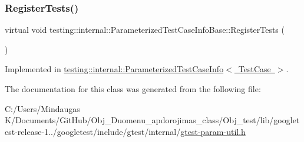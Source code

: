 \subsubsection{\texorpdfstring{RegisterTests()}{RegisterTests()}}
{\footnotesize\ttfamily virtual void testing\+::internal\+::\+Parameterized\+Test\+Case\+Info\+Base\+::\+Register\+Tests (\begin{DoxyParamCaption}{ }\end{DoxyParamCaption})\hspace{0.3cm}{\ttfamily [pure virtual]}}



Implemented in \mbox{\hyperlink{classtesting_1_1internal_1_1_parameterized_test_case_info_a7e118820b3074ce70c0440e2e49a50a1}{testing\+::internal\+::\+Parameterized\+Test\+Case\+Info$<$ Test\+Case $>$}}.



The documentation for this class was generated from the following file\+:\begin{DoxyCompactItemize}
\item 
C\+:/\+Users/\+Mindaugas K/\+Documents/\+Git\+Hub/\+Obj\+\_\+\+Duomenu\+\_\+apdorojimas\+\_\+class/\+Obj\+\_\+test/lib/googletest-\/release-\/1../googletest/include/gtest/internal/\mbox{\hyperlink{_obj__test_2lib_2googletest-release-1_88_81_2googletest_2include_2gtest_2internal_2gtest-param-util_8h}{gtest-\/param-\/util.\+h}}\end{DoxyCompactItemize}
